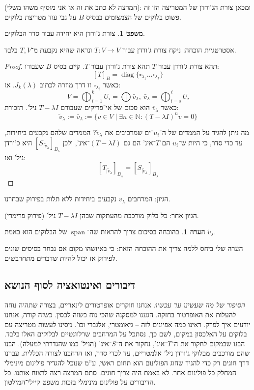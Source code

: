 \documentclass[a4paper]{article}
\newcommand\N     {\mathbb{N}}
\newcommand\ml    {\ell}
\DeclareMathOperator{\diag}    {diag}
\DeclareMathOperator{\Sp}      {span}
\newcommand\co        {\colon}
\renewcommand\lg      {\lambda}
\newcommand\tl    {\tilde}
\newcommand\csb[1]    {\left [ #1 \right ]}
\theoremstyle{definition}
\newtheorem{Theorem}{משפט}
\newtheorem{Remark}{הערה}
\newcommand\theo  [1] {\begin{Theorem}#1\end{Theorem}}
\newcommand\rmark [1] {\begin{Remark}#1\end{Remark}}
\begin{document}
	(המרצה לא כתב את זה אז אני מוסיף משהו משלי): ומכאן צורת הג'ורדן של המטריצה הזו זה פשוט בלוקים של הצמצומים בבסיס $B$ על גבי עוד מטריצת בלוקים. 
	
	\theo{צורת ג'ורדן היא יחידה עבור סדר הבלוקים. }אסטרטגיית הוכחה: ניקח צורת ג'ורדן עבור $T \co V \to V$ ונראה שהיא נקבעת מ־$T, V$ בלבד. 
	\begin{proof}
		תהא צורת ג'ורדן עבור $T$ תהא צורת ג'ורדן עבור $T$. קיים בסיס $B$ שעבורו: 
		\[ [T]_B = \diag\{\square_{\lg_1} \dots \square_{\lg_k}\} \]
		כאשר $\square_{\lg_i}$ זו דרך מוזרה לכתוב $J_k(\lg)$. 
		אז: 
		\[ V = \bigoplus_{i = 1}^{k} U_i = \bigoplus \bar v_{\lg}, \ \bar v_{\lg} = \bigoplus_{i = s}^{\ml} U_i \]
		כאשר $\bar v_{\lg}$ הוא סכום של אי־פריקים שעבורם $T - \lg I$ ניל'. תזכורת: 
		\[ \tl v_{\lg} := \bar v_{\lg} := \{v \in V \mid \exists n \in \N \co (T - \lg I)^nv = 0\} \]
		
		מה ניתן להגיד על הממדים של ה־$u_i$־ים שמרכיבים את $\tl v_\lg$? הממדים שלהם נקבעים ביחידות, עד כדי סדר, כי היות ש־$u_i$ הם $T$־אינ' הם גם $(T - \lg I)$־אינ', ולכן $[S_{|\tl v_\lg}]_{B_\lg}$ היא כ'ורדן ניל' ואז: 
		\[ \csb{T_{|\tl v_\lg}}_{B_\lg} = \csb{S_{|\tl v_\lg}}_{B_\lg} \]
	\end{proof}
	
	הגיון: המרחבים $v_\lg$ נקבעים ביחידות ללא תלות בפירוק שבחרנו. 
	
	הגיון אחר: כל בלוק מורכבת מהעתקות שבהן $T - \lg I$ ניל' (פירוק פרימרי). 
	
	\rmark{בהוכחה בסיכום צריך להראות שה־$\Sp$ של הבלוקים הוא באמת $\tl v_\lg$. }
	
	הערה שלי ביחס ללמה צריך את ההוכחה הזאת: כי באיזשהו מקום אם נבחר בסיסים שונים לפירוק אז יכול להיות שדברים מתחרבשים. 
	
	\subsection{דיבורים ואינטואציה לסוף הנושא}
	
	\textit{הסיפור של מה שעשינו עד עכשיו: }אנחנו חוקרים אופרטורים לינאריים, בצורה שתהיה נוחה להעלות את האופרטור בחזקה. הגענו למסקנה שהכי נוח כשזה לכסין. כשזה קורה, אנחנו יודעים איך לפרק. ראינו כמה אפיונים לזה – גיאומטרי, אלגברי וכו'. ניסינו לעשות מטריצה עם בלוקים על האלכסון במקום, לשם כך, נסתכל על המרחבים שרלוונטיים לבלוקים האלו בלבד. הבנו שבמקום לחקור את ה־$T$־אינ', נחקור את ה־$S$־אינ' (הניל' כמו שהגדרתי למעלה). הבנו שהם מורכבים מבלוקי ג'ורדן ניל' אלמטריים, עד לכדי סדר, ואז הרחבנו לצורה הכללית. עברנו דרך חוגים רק כדי להגיד שחוג הפולינום הוא תחום ראשי, ע''מ שנוכל להגדיר פולינום מינימלי המחלק כל פולינום אחר. לא באמת היה צריך חוגים. סתם המרצה רצה לרצוח אותנו. כל הדיבורים על פולינום מינימלי בזכות משפט קיילי־המילטון. 
	
\end{document}

